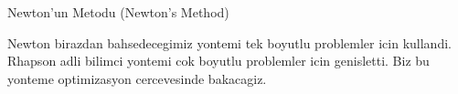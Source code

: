 \documentclass[12pt,fleqn]{article}\usepackage{../../common}
\begin{document}
Newton'un Metodu (Newton's Method)

Newton birazdan bahsedecegimiz yontemi tek boyutlu problemler icin
kullandi. Rhapson adli bilimci yontemi cok boyutlu problemler icin
genisletti. Biz bu yonteme optimizasyon cercevesinde bakacagiz. 
\end{document}
